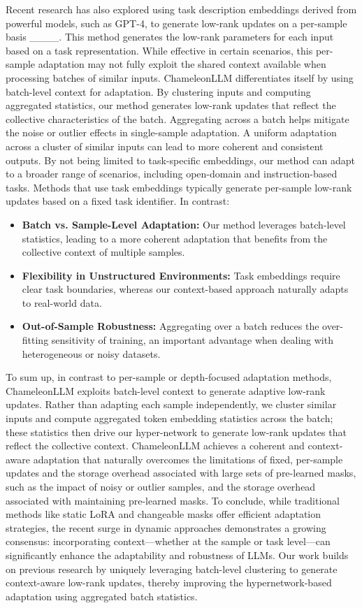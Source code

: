 Recent research has also explored using task description embeddings derived from powerful models, such as GPT-4, to generate low-rank updates on a per-sample basis ____. This method generates the low-rank parameters for each input based on a task representation. While effective in certain scenarios, this per-sample adaptation may not fully exploit the shared context available when processing batches of similar inputs. ChameleonLLM differentiates itself by using batch-level context for adaptation. By clustering inputs and computing aggregated statistics, our method generates low-rank updates that reflect the collective characteristics of the batch. Aggregating across a batch helps mitigate the noise or outlier effects in single-sample adaptation. A uniform adaptation across a cluster of similar inputs can lead to more coherent and consistent outputs. By not being limited to task-specific embeddings, our method can adapt to a broader range of scenarios, including open-domain and instruction-based tasks. Methods that use task embeddings typically generate per-sample low-rank updates based on a fixed task identifier. In contrast:
\begin{itemize}
    \item \textbf{Batch vs. Sample-Level Adaptation:} Our method leverages batch-level statistics, leading to a more coherent adaptation that benefits from the collective context of multiple samples.
    \item \textbf{Flexibility in Unstructured Environments:} Task embeddings require clear task boundaries, whereas our context-based approach naturally adapts to real-world data.
    \item \textbf{Out-of-Sample Robustness:} Aggregating over a batch reduces the over-fitting sensitivity of training, an important advantage when dealing with heterogeneous or noisy datasets.
\end{itemize}

To sum up, in contrast to per-sample or depth-focused adaptation methods, ChameleonLLM exploits batch-level context to generate adaptive low-rank updates. Rather than adapting each sample independently, we cluster similar inputs and compute aggregated token embedding statistics across the batch; these statistics then drive our hyper-network to generate low-rank updates that reflect the collective context. ChameleonLLM achieves a coherent and context-aware adaptation that naturally overcomes the limitations of fixed, per-sample updates and the storage overhead associated with large sets of pre-learned masks, such as the impact of noisy or outlier samples, and the storage overhead associated with maintaining pre-learned masks. To conclude, while traditional methods like static LoRA and changeable masks offer efficient adaptation strategies, the recent surge in dynamic approaches demonstrates a growing consensus: incorporating context—whether at the sample or task level—can significantly enhance the adaptability and robustness of LLMs. Our work builds on previous research by uniquely leveraging batch-level clustering to generate context-aware low-rank updates, thereby improving the hypernetwork-based adaptation using aggregated batch statistics.
